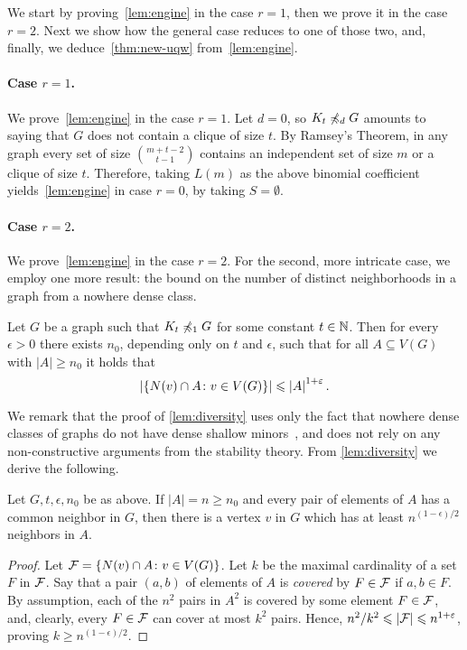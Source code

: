 We start by proving~\cref{lem:engine} in the case $r=1$,
then we prove it in the case $r=2$. Next we show how the general case reduces to one of those two, and, finally, we deduce~\cref{thm:new-uqw} from~\cref{lem:engine}.

\paragraph{Case $r=1$.}
We prove~\cref{lem:engine} in the case $r=1$.
Let $d=0$, so $K_t\not\minor_d G$ amounts to saying that $G$
does not contain a clique of size $t$. By Ramsey's Theorem, in any graph every set of size $\binom{m+t-2}{t-1}$ contains an
independent set of size $m$ or a clique of size $t$. Therefore, 
taking $L(m)$ as the above binomial coefficient yields~\cref{lem:engine} in case $r=0$, by taking $S=\emptyset$.

\paragraph{Case $r=2$.}
We prove~\cref{lem:engine} in the case $r=2$.
For the second, more intricate case, 
we employ one more result: the bound on the number of distinct neighborhoods in a graph from a nowhere dense class.

\begin{lemma}\label{lem:diversity}
Let $G$ be a graph such that $K_t\not\minor_{1} G$ for some constant $t\in \N$. 
Then for every $\epsilon>0$ there exists $n_0$, depending only on $t$ and $\epsilon$, such that for all $A\subseteq V(G)$ with $|A|\geq n_0$ it holds that
\[\abs{\{N(v)\cap A \colon v\in V(G)\}}\leq\abs{A}^{1+\epsilon}.\]
\end{lemma}



We remark that the proof of \cref{lem:diversity} uses only the fact that
nowhere dense classes of graphs do not have dense 
shallow minors~\cite{dvorak2007asymptotical,jiang2011compact}, and does not rely on any non-constructive arguments from the stability theory.
From \cref{lem:diversity} we derive the following.

\begin{corollary}\label{cor:diversity}
  Let $G,t,\epsilon,n_0$ be as above.
  If $|A|=n\ge n_0$ and every pair of elements of $A$ has a common neighbor in $G$,
  then there is a vertex $v$ in $G$ which has at least $n^{(1-\epsilon)/2}$ neighbors in $A$.
\end{corollary}
\begin{proof}Let ${\cal F}=\set{N(v)\cap A\colon v\in V(G)}$. 
  Let $k$ be the maximal cardinality of a set $F$ in ${\cal F}$.
  Say that a pair $(a,b)$ of elements of $A$ is \emph{covered} by $F\in {\cal F}$
  if  $a,b\in F$.
  By assumption, each of the $n^2$ pairs in $A^2$ is covered by some element $F\in {\cal F}$, and,
  clearly, every $F\in {\cal F}$ can cover at most $k^2$ pairs. 
  Hence, $n^2/k^2\le |{\cal F}|\le  n^{1+\epsilon}$, proving $k\ge n^{(1-\epsilon)/2}$.
\end{proof}

